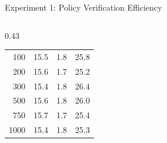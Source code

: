 \documentclass[aspectratio=169,10pt]{beamer}
\begin{document}
\begin{frame}[t]{Experiment 1: Policy Verification Efficiency}
\begin{columns}[T,onlytextwidth]
\begin{column}{0.43\textwidth}
\begin{tabular}{@{}r rrr@{}}
\tiny 100  & \tiny 15.5 & \tiny 1.8 & \tiny 25.8 \\
\tiny 200  & \tiny 15.6 & \tiny 1.7 & \tiny 25.2 \\
\tiny 300  & \tiny 15.4 & \tiny 1.8 & \tiny 26.4 \\
\tiny 500  & \tiny 15.6 & \tiny 1.8 & \tiny 26.0 \\
\tiny 750  & \tiny 15.7 & \tiny 1.7 & \tiny 25.4 \\
\tiny 1000 & \tiny 15.4 & \tiny 1.8 & \tiny 25.3 \\
\bottomrule
\end{tabular}
\end{column}
\end{columns}
\end{frame}

\end{document}
